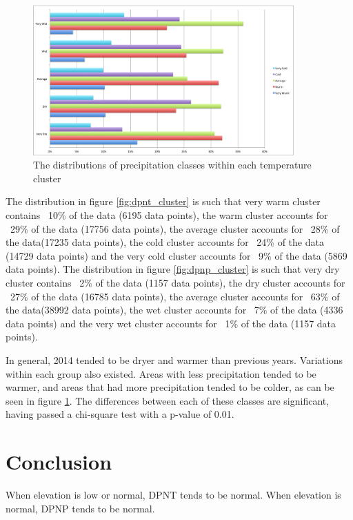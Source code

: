 \documentclass[11pt]{article}
\begin{document}
\begin{figure}[h!]
\centering
\includegraphics[width=10cm]{ClassDistributions}
\caption{The distributions of precipitation classes within each temperature cluster}
\label{fig:class_distributions}
\end{figure}


The distribution in figure \ref{fig:dpnt_cluster} is such that very warm cluster contains ~10\% of the data (6195 data points), the warm cluster accounts for ~29\% of the data (17756 data points), the average cluster accounts for ~28\% of the data(17235 data points), the cold cluster accounts for ~24\% of the data (14729 data points) and the very cold cluster accounts for ~9\% of the data (5869 data points). The distribution in figure \ref{fig:dpnp_cluster} is such that very dry cluster contains ~2\% of the data (1157 data points), the dry cluster accounts for ~27\% of the data (16785 data points), the average cluster accounts for ~63\% of the data(38992 data points), the wet cluster accounts for ~7\% of the data (4336 data points) and the very wet cluster accounts for ~1\% of the data (1157 data points). 

In general, 2014 tended to be dryer and warmer than previous years. Variations within each group also existed. Areas with less precipitation tended to be warmer, and areas that had more precipitation tended to be colder, as can be seen in figure \ref{fig:class_distributions}. The differences between each of these classes are significant, having passed a chi-square test with a p-value of 0.01. 

\section{Conclusion}
When elevation is low or normal, DPNT tends to be normal. When elevation is normal, DPNP tends to be normal.



\end{document}
